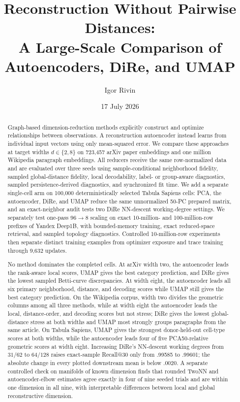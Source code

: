 \documentclass[10pt]{article}
\title{\textbf{Reconstruction Without Pairwise Distances:}\\
       A Large-Scale Comparison of Autoencoders, DiRe, and UMAP}
\author{Igor Rivin}
\date{17 July 2026}
\begin{document}
\maketitle

\begin{abstract}
Graph-based dimension-reduction methods explicitly construct and optimize
relationships between observations.  A reconstruction autoencoder instead learns from
individual input vectors using only mean-squared error.  We compare these approaches at
target widths $d\in\{2,8\}$ on 723,457 arXiv paper embeddings and one million Wikipedia
paragraph embeddings.  All reducers receive the same row-normalized data and are
evaluated over three seeds using sample-conditional neighborhood fidelity, sampled
global-distance fidelity, local decodability, label- or group-aware diagnostics, sampled
persistence-derived diagnostics, and synchronized fit time.
We add a separate single-cell arm on 100,000 deterministically selected Tabula Sapiens
cells: PCA, the autoencoder, DiRe, and UMAP reduce the same unnormalized 50-PC prepared
matrix, and an exact-neighbor audit tests two DiRe NN-descent working-degree settings.
We separately test one-pass $96\to8$ scaling on exact 10-million- and 100-million-row
prefixes of Yandex Deep1B, with bounded-memory training, exact reduced-space retrieval,
and sampled topology diagnostics.  Controlled 10-million-row experiments then separate
distinct training examples from optimizer exposure and trace training through 9,632
updates.

No method dominates the completed cells.  At arXiv width two, the autoencoder leads the
rank-aware local scores, UMAP gives the best category prediction, and DiRe gives the
lowest sampled Betti-curve discrepancies.  At width eight, the autoencoder leads all six
primary neighborhood, distance, and decoding scores while UMAP still gives the best
category prediction.  On the
Wikipedia corpus, width two divides the geometric columns among all three methods, while
at width eight the autoencoder leads the local, distance-order, and decoding scores but
not stress; DiRe gives the lowest global-distance stress at both widths and UMAP most
strongly groups paragraphs from the same article.  On Tabula Sapiens, UMAP gives the
strongest donor-held-out cell-type scores at both widths, while the autoencoder leads
four of five PCA50-relative geometric scores at width eight.  Increasing DiRe's
NN-descent working degrees from $31/62$ to $64/128$ raises exact-sample Recall@30 only
from .99585 to .99601; the absolute change in every plotted downstream mean is below
.0020.  A separate controlled check on
manifolds of known dimension
finds that rounded TwoNN and autoencoder-elbow estimates agree exactly in four of nine
seeded trials and are within one dimension in all nine, with interpretable differences
between local and global reconstructive dimension.


\end{abstract}
\end{document}
